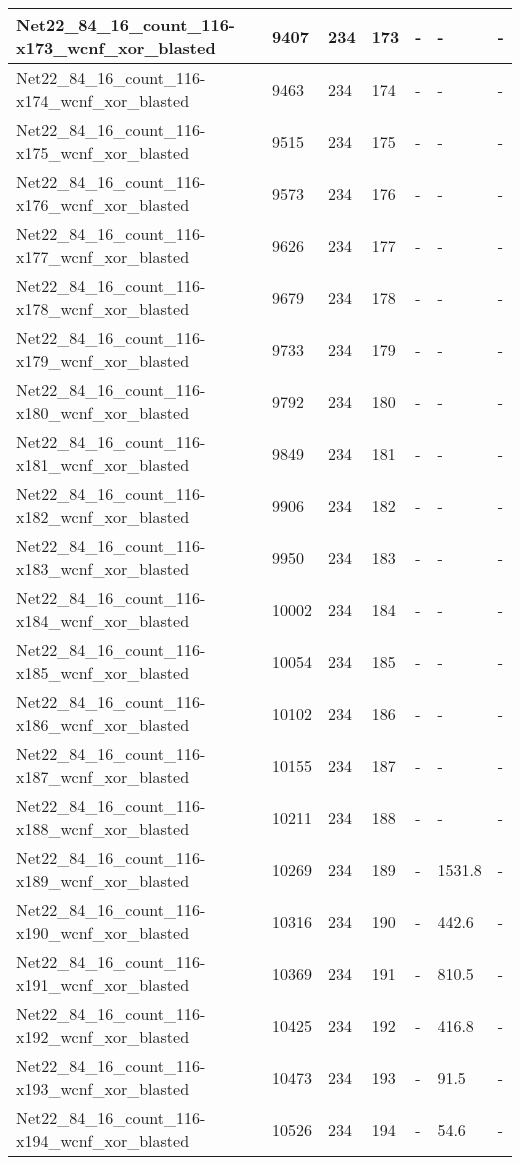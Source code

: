 \begin{scriptsize}
\begin{longtable}{|p{5cm}|l|l|l|l|l|l|}
Net22\_84\_16\_count\_116-x173\_wcnf\_xor\_blasted&9407&234&173&-&-&- \\ \hline 
Net22\_84\_16\_count\_116-x174\_wcnf\_xor\_blasted&9463&234&174&-&-&- \\ \hline 
Net22\_84\_16\_count\_116-x175\_wcnf\_xor\_blasted&9515&234&175&-&-&- \\ \hline 
Net22\_84\_16\_count\_116-x176\_wcnf\_xor\_blasted&9573&234&176&-&-&- \\ \hline 
Net22\_84\_16\_count\_116-x177\_wcnf\_xor\_blasted&9626&234&177&-&-&- \\ \hline 
Net22\_84\_16\_count\_116-x178\_wcnf\_xor\_blasted&9679&234&178&-&-&- \\ \hline 
Net22\_84\_16\_count\_116-x179\_wcnf\_xor\_blasted&9733&234&179&-&-&- \\ \hline 
Net22\_84\_16\_count\_116-x180\_wcnf\_xor\_blasted&9792&234&180&-&-&- \\ \hline 
Net22\_84\_16\_count\_116-x181\_wcnf\_xor\_blasted&9849&234&181&-&-&- \\ \hline 
Net22\_84\_16\_count\_116-x182\_wcnf\_xor\_blasted&9906&234&182&-&-&- \\ \hline 
Net22\_84\_16\_count\_116-x183\_wcnf\_xor\_blasted&9950&234&183&-&-&- \\ \hline 
Net22\_84\_16\_count\_116-x184\_wcnf\_xor\_blasted&10002&234&184&-&-&- \\ \hline 
Net22\_84\_16\_count\_116-x185\_wcnf\_xor\_blasted&10054&234&185&-&-&- \\ \hline 
Net22\_84\_16\_count\_116-x186\_wcnf\_xor\_blasted&10102&234&186&-&-&- \\ \hline 
Net22\_84\_16\_count\_116-x187\_wcnf\_xor\_blasted&10155&234&187&-&-&- \\ \hline 
Net22\_84\_16\_count\_116-x188\_wcnf\_xor\_blasted&10211&234&188&-&-&- \\ \hline 
Net22\_84\_16\_count\_116-x189\_wcnf\_xor\_blasted&10269&234&189&-&1531.8&- \\ \hline 
Net22\_84\_16\_count\_116-x190\_wcnf\_xor\_blasted&10316&234&190&-&442.6&- \\ \hline 
Net22\_84\_16\_count\_116-x191\_wcnf\_xor\_blasted&10369&234&191&-&810.5&- \\ \hline 
Net22\_84\_16\_count\_116-x192\_wcnf\_xor\_blasted&10425&234&192&-&416.8&- \\ \hline 
Net22\_84\_16\_count\_116-x193\_wcnf\_xor\_blasted&10473&234&193&-&91.5&- \\ \hline 
Net22\_84\_16\_count\_116-x194\_wcnf\_xor\_blasted&10526&234&194&-&54.6&- \\ \hline 

\end{longtable}
\end{scriptsize}
